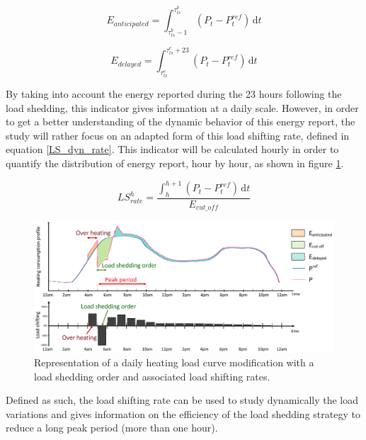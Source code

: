 \documentclass[buildings,article,submit,moreauthors,pdftex,10pt,a4paper]{mdpi}
\theoremstyle{mdpi}
\newcounter{re}
\theoremstyle{mdpidefinition}
\begin{document}
\begin{equation}
\label{anticipated_eq}
    E_{anticipated} = \int_{\tau_{ls}^{b} - 1}^{\tau_{ls}^{b}} (P_{t} - P_{t}^{ref})\, \mathrm{d}t   
\end{equation}

\begin{equation}
\label{delayed_eq}
    E_{delayed} = \int_{\tau_{ls}^{e}}^{\tau_{ls}^{e} + 23} (P_{t} - P_{t}^{ref})\, \mathrm{d}t
\end{equation}

By taking into account the energy reported during the 23 hours following the load shedding, this indicator gives information at a daily scale. However, in order to get a better understanding of the dynamic behavior of this energy report, the study will rather focus on an adapted form of this load shifting rate, defined in equation \ref{LS_dyn_rate}. This indicator will be calculated hourly in order to quantify the distribution of energy report, hour by hour, as shown in figure \ref{load_shed_repres}.

\begin{equation}
\label{LS_dyn_rate}
LS_{rate}^{h} = \frac{ \int_{h}^{h+1}(P_{t} - P_{t}^{ref})\, \mathrm{d}t}{E_{cut\_off}}
\end{equation}

\begin{figure}[H]
    \centering
    \includegraphics[scale=0.2]{Effacement_et_taux_de_report_en.png}
    \caption{Representation of a daily heating load curve modification with a load shedding order and associated load shifting rates.}
    \label{load_shed_repres}
\end{figure}

Defined as such, the load shifting rate can be used to study dynamically the load variations and gives information on the efficiency of the load shedding strategy to reduce a long peak period (more than one hour).
\end{document}
